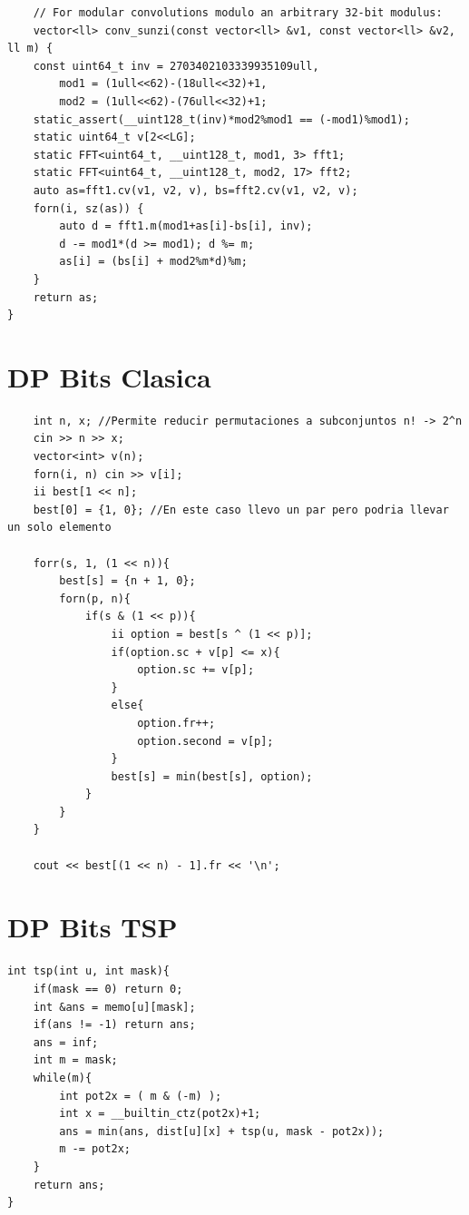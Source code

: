 \documentclass{article}
\begin{document}
\begin{lstlisting}
    // For modular convolutions modulo an arbitrary 32-bit modulus:
    vector<ll> conv_sunzi(const vector<ll> &v1, const vector<ll> &v2, ll m) {
    const uint64_t inv = 2703402103339935109ull,
        mod1 = (1ull<<62)-(18ull<<32)+1,
        mod2 = (1ull<<62)-(76ull<<32)+1;
    static_assert(__uint128_t(inv)*mod2%mod1 == (-mod1)%mod1);
    static uint64_t v[2<<LG];
    static FFT<uint64_t, __uint128_t, mod1, 3> fft1;
    static FFT<uint64_t, __uint128_t, mod2, 17> fft2;
    auto as=fft1.cv(v1, v2, v), bs=fft2.cv(v1, v2, v);
    forn(i, sz(as)) {
        auto d = fft1.m(mod1+as[i]-bs[i], inv);
        d -= mod1*(d >= mod1); d %= m;
        as[i] = (bs[i] + mod2%m*d)%m;
    }
    return as;
}
\end{lstlisting}


\section{DP Bits Clasica}
\begin{lstlisting}
    int n, x; //Permite reducir permutaciones a subconjuntos n! -> 2^n
    cin >> n >> x;
    vector<int> v(n);
    forn(i, n) cin >> v[i];
    ii best[1 << n];
    best[0] = {1, 0}; //En este caso llevo un par pero podria llevar un solo elemento
 
    forr(s, 1, (1 << n)){
        best[s] = {n + 1, 0};
        forn(p, n){
            if(s & (1 << p)){
                ii option = best[s ^ (1 << p)];
                if(option.sc + v[p] <= x){
                    option.sc += v[p];
                }
                else{
                    option.fr++;
                    option.second = v[p];
                }
                best[s] = min(best[s], option);
            }
        }
    }
 
    cout << best[(1 << n) - 1].fr << '\n';
\end{lstlisting}


\section{DP Bits TSP}
\begin{lstlisting}
int tsp(int u, int mask){
    if(mask == 0) return 0;		
    int &ans = memo[u][mask];
    if(ans != -1) return ans;	
    ans = inf;	
    int m = mask;
    while(m){
        int pot2x = ( m & (-m) );
        int x = __builtin_ctz(pot2x)+1;
        ans = min(ans, dist[u][x] + tsp(u, mask - pot2x));
        m -= pot2x;
    }
    return ans;
}
\end{lstlisting}
\end{document}
